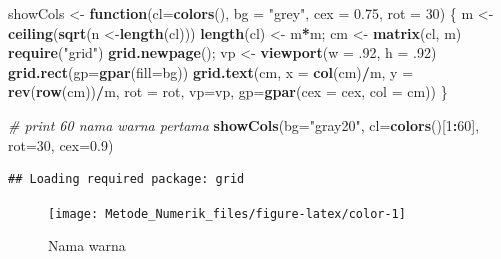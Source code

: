 \documentclass[
]{book}
\newenvironment{Shaded}{\begin{snugshade}}{\end{snugshade}}
\newcommand{\AttributeTok}[1]{\textcolor[rgb]{0.13,0.29,0.53}{#1}}
\newcommand{\CommentTok}[1]{\textcolor[rgb]{0.56,0.35,0.01}{\textit{#1}}}
\newcommand{\ControlFlowTok}[1]{\textcolor[rgb]{0.13,0.29,0.53}{\textbf{#1}}}
\newcommand{\DecValTok}[1]{\textcolor[rgb]{0.00,0.00,0.81}{#1}}
\newcommand{\FloatTok}[1]{\textcolor[rgb]{0.00,0.00,0.81}{#1}}
\newcommand{\FunctionTok}[1]{\textcolor[rgb]{0.13,0.29,0.53}{\textbf{#1}}}
\newcommand{\NormalTok}[1]{#1}
\newcommand{\OtherTok}[1]{\textcolor[rgb]{0.56,0.35,0.01}{#1}}
\newcommand{\SpecialCharTok}[1]{\textcolor[rgb]{0.81,0.36,0.00}{\textbf{#1}}}
\newcommand{\StringTok}[1]{\textcolor[rgb]{0.31,0.60,0.02}{#1}}
\theoremstyle{definition}
\theoremstyle{definition}
\theoremstyle{definition}
\theoremstyle{definition}
\theoremstyle{remark}
\begin{document}
\begin{Shaded}
\begin{Highlighting}[]
\NormalTok{showCols }\OtherTok{\textless{}{-}} \ControlFlowTok{function}\NormalTok{(}\AttributeTok{cl=}\FunctionTok{colors}\NormalTok{(), }\AttributeTok{bg =} \StringTok{"grey"}\NormalTok{,}
                     \AttributeTok{cex =} \FloatTok{0.75}\NormalTok{, }\AttributeTok{rot =} \DecValTok{30}\NormalTok{) \{}
\NormalTok{    m }\OtherTok{\textless{}{-}} \FunctionTok{ceiling}\NormalTok{(}\FunctionTok{sqrt}\NormalTok{(n }\OtherTok{\textless{}{-}}\FunctionTok{length}\NormalTok{(cl)))}
    \FunctionTok{length}\NormalTok{(cl) }\OtherTok{\textless{}{-}}\NormalTok{ m}\SpecialCharTok{*}\NormalTok{m; cm }\OtherTok{\textless{}{-}} \FunctionTok{matrix}\NormalTok{(cl, m)}
    \FunctionTok{require}\NormalTok{(}\StringTok{"grid"}\NormalTok{)}
    \FunctionTok{grid.newpage}\NormalTok{(); vp }\OtherTok{\textless{}{-}} \FunctionTok{viewport}\NormalTok{(}\AttributeTok{w =}\NormalTok{ .}\DecValTok{92}\NormalTok{, }\AttributeTok{h =}\NormalTok{ .}\DecValTok{92}\NormalTok{)}
    \FunctionTok{grid.rect}\NormalTok{(}\AttributeTok{gp=}\FunctionTok{gpar}\NormalTok{(}\AttributeTok{fill=}\NormalTok{bg))}
    \FunctionTok{grid.text}\NormalTok{(cm, }\AttributeTok{x =} \FunctionTok{col}\NormalTok{(cm)}\SpecialCharTok{/}\NormalTok{m, }\AttributeTok{y =} \FunctionTok{rev}\NormalTok{(}\FunctionTok{row}\NormalTok{(cm))}\SpecialCharTok{/}\NormalTok{m, }\AttributeTok{rot =}\NormalTok{ rot,}
              \AttributeTok{vp=}\NormalTok{vp, }\AttributeTok{gp=}\FunctionTok{gpar}\NormalTok{(}\AttributeTok{cex =}\NormalTok{ cex, }\AttributeTok{col =}\NormalTok{ cm))}
\NormalTok{\}}

\CommentTok{\# print 60 nama warna pertama}
\FunctionTok{showCols}\NormalTok{(}\AttributeTok{bg=}\StringTok{"gray20"}\NormalTok{, }\AttributeTok{cl=}\FunctionTok{colors}\NormalTok{()[}\DecValTok{1}\SpecialCharTok{:}\DecValTok{60}\NormalTok{], }\AttributeTok{rot=}\DecValTok{30}\NormalTok{, }\AttributeTok{cex=}\FloatTok{0.9}\NormalTok{)}
\end{Highlighting}
\end{Shaded}

\begin{verbatim}
## Loading required package: grid
\end{verbatim}

\begin{figure}

{\centering \texttt{[image: Metode\_Numerik\_files/figure-latex/color-1]} 

}

\caption{Nama warna}\label{fig:color}
\end{figure}
\end{document}

